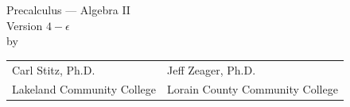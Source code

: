 \allsectionsfont{\mdseries \scshape}
\makeatletter
\renewcommand\l@section{\@dottedtocline{1}{1.5em}{3em}}
\renewcommand\l@subsection{\@dottedtocline{2}{4.5em}{3.5em}}
\makeatother
\pagestyle{fancy}

\renewcommand{\textinterrobang}{$! \! \! ?$}


\usepackage[scaled=.92]{helvet}   
\renewcommand{\familydefault}{\sfdefault}  %
\usepackage[helvet]{sfmath}  %
\allsectionsfont{\sffamily}  %

\makeatletter
{}
\makeatother

\makeindex



\renewcommand{\chaptermark}[1]%
                  {\markboth{#1}{}}
\renewcommand{\sectionmark}[1]%
               {\markright{\thesection\ #1}}
\renewcommand{\headrulewidth}{0pt}
\lhead[\fancyplain{}{\thepage}]%
      {\fancyplain{}{\nouppercase{\rightmark}}}
\rhead[\fancyplain{}{\nouppercase{\leftmark}}]%
      {\fancyplain{}{\thepage}}
\cfoot{}

\frontmatter



\begin{titlepage}
\begin{center}

\vspace*{0.1\paperheight}

\Huge Precalculus --- Algebra II  \\ \vspace{.1in} \large Version $4 - \epsilon$  \\ \vspace{.25in} \large by

\vspace{0.1\paperheight}

\begin{tabularx}{0.953\linewidth}{YY} Carl Stitz, Ph.D. &  Jeff Zeager, Ph.D. \\ Lakeland Community College & Lorain County Community College \\\end{tabularx}

\vfill

\begin{center}
    \sophia
\end{center}

\end{center}
\end{titlepage}

